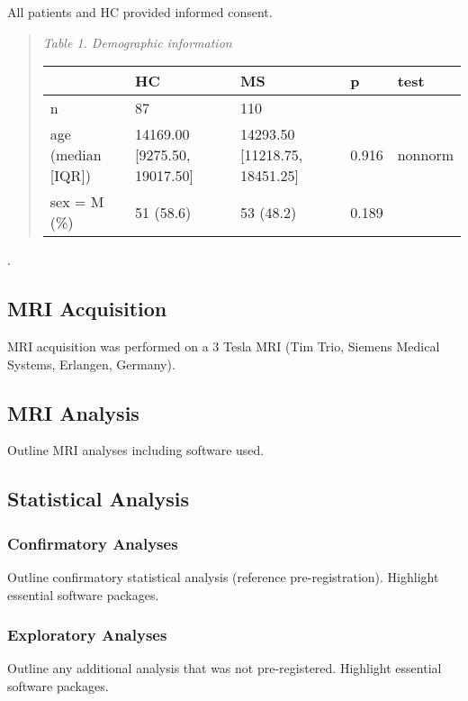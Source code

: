 \documentclass[11pt,]{article}
\begin{document}
All patients and HC provided informed consent.

\begin{quote}
\emph{Table 1. Demographic information}

\begin{tabular}{l|l|l|l|l}
\hline
& HC & MS & p & test\\
\hline
n & 87 & 110 &  & \\
\hline
age (median [IQR]) & 14169.00 [9275.50, 19017.50] & 14293.50 [11218.75, 18451.25] & 0.916 & nonnorm\\
\hline
sex = M (\%) & 51 (58.6) & 53 (48.2) & 0.189 & \\
\hline
\end{tabular}
\end{quote}

.

\subsection{MRI Acquisition}\label{mri-acquisition}

MRI acquisition was performed on a 3 Tesla MRI (Tim Trio, Siemens
Medical Systems, Erlangen, Germany).

\subsection{MRI Analysis}\label{mri-analysis}

Outline MRI analyses including software used.

\subsection{Statistical Analysis}\label{statistical-analysis}

\subsubsection{Confirmatory Analyses}\label{confirmatory-analyses}

Outline confirmatory statistical analysis (reference pre-registration).
Highlight essential software packages.

\subsubsection{Exploratory Analyses}\label{exploratory-analyses}

Outline any additional analysis that was not pre-registered. Highlight
essential software packages.
\end{document}
